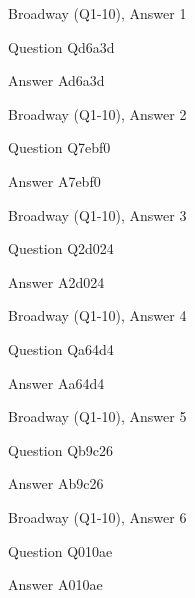 \documentclass[11pt]{beamer}
\begin{document}
\begin{frame}[t]{Broadway (Q1-10), Answer 1}
\vspace{2em}
\begin{block}{Question}
Qd6a3d
\end{block}
\pause{}
\begin{block}{Answer}
Ad6a3d
\end{block}
\end{frame}
    

\begin{frame}[t]{Broadway (Q1-10), Answer 2}
\vspace{2em}
\begin{block}{Question}
Q7ebf0
\end{block}
\pause{}
\begin{block}{Answer}
A7ebf0
\end{block}
\end{frame}
    

\begin{frame}[t]{Broadway (Q1-10), Answer 3}
\vspace{2em}
\begin{block}{Question}
Q2d024
\end{block}
\pause{}
\begin{block}{Answer}
A2d024
\end{block}
\end{frame}
    

\begin{frame}[t]{Broadway (Q1-10), Answer 4}
\vspace{2em}
\begin{block}{Question}
Qa64d4
\end{block}
\pause{}
\begin{block}{Answer}
Aa64d4
\end{block}
\end{frame}
    

\begin{frame}[t]{Broadway (Q1-10), Answer 5}
\vspace{2em}
\begin{block}{Question}
Qb9c26
\end{block}
\pause{}
\begin{block}{Answer}
Ab9c26
\end{block}
\end{frame}
    

\begin{frame}[t]{Broadway (Q1-10), Answer 6}
\vspace{2em}
\begin{block}{Question}
Q010ae
\end{block}
\pause{}
\begin{block}{Answer}
A010ae
\end{block}
\end{frame}
    
\end{document}
